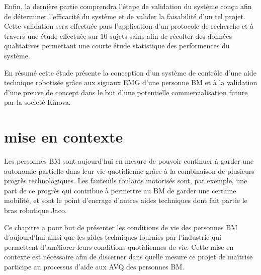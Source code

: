 \documentclass[letterpaper, twoside, 12pt, memoire, creativecommons, hyperref]{thETS}
\begin{document}
\begin{introduction}
Enfin, la dernière partie comprendra l'étape de validation du système conçu afin de déterminer l'efficacité du système et de valider la faisabilité d'un tel projet. Cette validation sera effectuée pars l'application d'un protocole de recherche et à travers une étude effectuée sur 10 sujets sains afin de récolter des données qualitatives permettant une courte étude statistique des performences du système.

En résumé cette étude présente la conception d'un système de contrôle d'une aide technique robotisée grâce aux signaux EMG d'une personne BM et à la validation d'une preuve de concept dans le but d'une potentielle commercialisation future par la societé Kinova.

%



\end{introduction}

%
%

\chapter{mise en contexte}

Les personnes BM sont aujourd'hui en mesure de pouvoir continuer à garder une autonomie partielle dans leur vie quotidienne grâce à la combinaison de plusieurs progrès technologiques. Les fauteuils roulants motorisés sont, par exemple, une part de ce progrès qui contribue à permettre au BM de garder une certaine mobilité, et sont le point d'encrage d'autres aides techniques dont fait partie le bras robotique Jaco.

Ce chapitre a pour but de présenter les conditions de vie des personnes BM d'aujourd'hui ainsi que les aides techniques fournies par l'industrie qui permettent d'améliorer leurs conditions quotidiennes de vie. Cette mise en contexte est nécessaire afin de discerner dans quelle mesure ce projet de maîtrise participe au processus d'aide aux AVQ des personnes BM.
\end{document}
